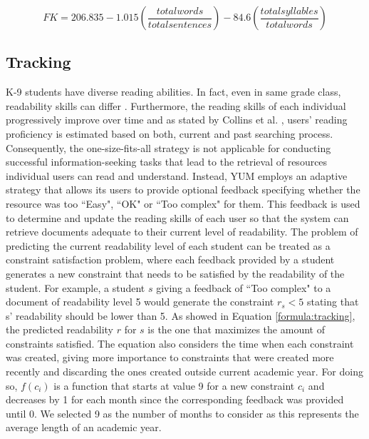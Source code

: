 \documentclass{sig-alternate-05-2015}
\begin{document}
\begin{equation}
 FK = 206.835 -1.015 ( \frac{total words}{total sentences}  ) -84.6 ( \frac{total syllables}{total words}) 
\label{formula:flesh}
\end{equation}
\subsection{Tracking}
K-9 students have diverse reading abilities. In fact, even in same grade class,  readability skills can differ \cite{Bow92}. Furthermore, the reading skills of each individual progressively improve over time\cite{sh13} and as stated by Collins et al. \cite{Col11}, users' reading proficiency is estimated based on both, current and past searching process. Consequently, the one-size-fits-all strategy is not applicable for conducting successful information-seeking tasks that lead to the retrieval of resources individual users can read and understand. Instead, YUM employs an adaptive strategy that allows its users to provide optional feedback specifying whether the resource was too ``Easy", ``OK" or ``Too complex" for them. This feedback is used to determine and update the reading skills of each user so that the system can retrieve documents adequate to their current level of readability.    
The problem of predicting the current readability level of each student can be treated as a constraint satisfaction problem, where each feedback  provided by a student  generates  a new constraint that needs to be satisfied by the readability  of  the student. For example, a student $s$ giving a feedback of ``Too complex" to a document of readability level 5 would generate the constraint $r_s < 5$ stating that s' readability should be lower than 5. As showed in Equation \ref{formula:tracking}, the predicted readability  $r$  for $s$ is the one that maximizes the amount of constraints satisfied. The equation also considers the time when each constraint was created, giving more importance to constraints that were created more recently and discarding the ones created outside current academic year. For doing so, $f(c_i)$ is a function  that starts at value 9 for a new constraint $c_i$ and decreases by 1 for each month since the corresponding feedback was provided until 0. We selected 9 as the number of months to consider as this represents the average length of an academic year.%
\end{document}
